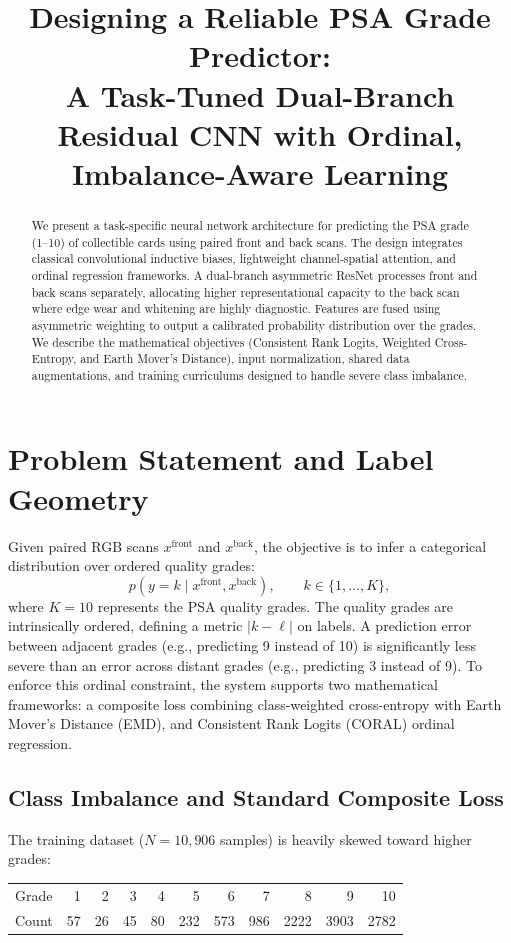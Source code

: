 \documentclass[12pt]{article}
\title{Designing a Reliable PSA Grade Predictor:\\
A Task-Tuned Dual-Branch Residual CNN with Ordinal, Imbalance-Aware Learning}
\author{}
\date{}
\begin{document}
\maketitle

\begin{abstract}
We present a task-specific neural network architecture for predicting the PSA grade (1--10) of collectible cards using paired front and back scans.
The design integrates classical convolutional inductive biases, lightweight channel-spatial attention, and ordinal regression frameworks.
A dual-branch asymmetric ResNet processes front and back scans separately, allocating higher representational capacity to the back scan where edge wear and whitening are highly diagnostic.
Features are fused using asymmetric weighting to output a calibrated probability distribution over the grades.
We describe the mathematical objectives (Consistent Rank Logits, Weighted Cross-Entropy, and Earth Mover's Distance), input normalization, shared data augmentations, and training curriculums designed to handle severe class imbalance.
\end{abstract}

\section{Problem Statement and Label Geometry}
Given paired RGB scans $x^{\text{front}}$ and $x^{\text{back}}$, the objective is to infer a categorical distribution over ordered quality grades:
\[
p(y=k \mid x^{\text{front}},x^{\text{back}}), \qquad k \in \{1,\dots,K\},
\]
where $K = 10$ represents the PSA quality grades.
The quality grades are intrinsically ordered, defining a metric $|k - \ell|$ on labels.
A prediction error between adjacent grades (e.g., predicting 9 instead of 10) is significantly less severe than an error across distant grades (e.g., predicting 3 instead of 9).
To enforce this ordinal constraint, the system supports two mathematical frameworks: a composite loss combining class-weighted cross-entropy with Earth Mover's Distance (EMD), and Consistent Rank Logits (CORAL) ordinal regression.

\subsection{Class Imbalance and Standard Composite Loss}
The training dataset ($N = 10{,}906$ samples) is heavily skewed toward higher grades:

\begin{center}
\begin{tabular}{lrrrrrrrrrr}
\toprule
Grade & 1 & 2 & 3 & 4 & 5 & 6 & 7 & 8 & 9 & 10 \\
Count & 57 & 26 & 45 & 80 & 232 & 573 & 986 & 2222 & 3903 & 2782 \\
\bottomrule
\end{tabular}
\end{center}
\end{document}
